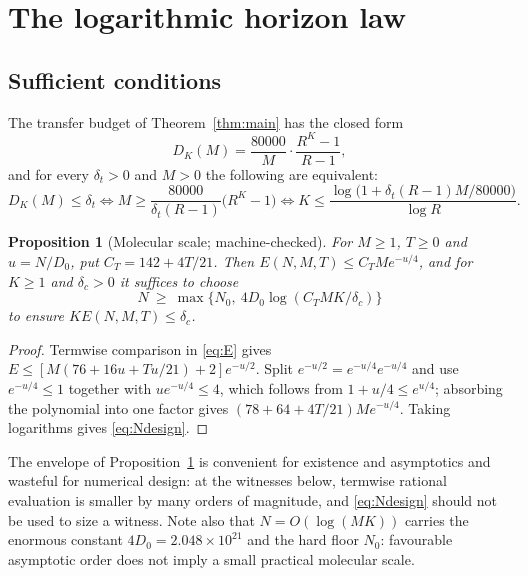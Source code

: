 \documentclass[11pt,a4paper]{article}
\theoremstyle{plain}
\newtheorem{proposition}[theorem]{Proposition}
\theoremstyle{definition}
\theoremstyle{remark}
\begin{document}
\section{The logarithmic horizon law}\label{sec:horizon}

\subsection{Sufficient conditions}

The transfer budget of Theorem~\ref{thm:main} has the closed form
\begin{equation}\label{eq:closed}
D_K(M)=\frac{80000}{M}\cdot\frac{R^K-1}{R-1},
\end{equation}
and for every $\delta_t>0$ and $M>0$ the following are equivalent:
\begin{equation}\label{eq:horizon}
D_K(M)\le\delta_t
\iff M\ge\frac{80000}{\delta_t(R-1)}\bigl(R^K-1\bigr)
\iff K\le\frac{\log\bigl(1+\delta_t(R-1)M/80000\bigr)}{\log R}.
\end{equation}

\begin{proposition}[Molecular scale; machine-checked]\label{prop:sizing}
For $M\ge1$, $T\ge0$ and $u=N/D_0$, put $C_T=142+4T/21$. Then
$E(N,M,T)\le C_TMe^{-u/4}$, and for $K\ge1$ and $\delta_c>0$ it suffices to
choose
\begin{equation}\label{eq:Ndesign}
N\ \ge\ \max\bigl\{N_0,\ 4D_0\log(C_TMK/\delta_c)\bigr\}
\end{equation}
to ensure $KE(N,M,T)\le\delta_c$.
\end{proposition}

\begin{proof}
Termwise comparison in \eqref{eq:E} gives
$E\le[M(76+16u+Tu/21)+2]e^{-u/2}$. Split $e^{-u/2}=e^{-u/4}e^{-u/4}$ and use
$e^{-u/4}\le1$ together with $ue^{-u/4}\le4$, which follows from
$1+u/4\le e^{u/4}$; absorbing the polynomial into one factor gives
$(78+64+4T/21)Me^{-u/4}$. Taking logarithms gives \eqref{eq:Ndesign}.
\end{proof}

The envelope of Proposition~\ref{prop:sizing} is convenient for existence and
asymptotics and wasteful for numerical design: at the witnesses below,
termwise rational evaluation is smaller by many orders of magnitude, and
\eqref{eq:Ndesign} should not be used to size a witness. Note also that
$N=O(\log(MK))$ carries the enormous constant $4D_0=2.048\times10^{21}$ and the
hard floor $N_0$: favourable asymptotic order does not imply a small practical
molecular scale.
\end{document}
